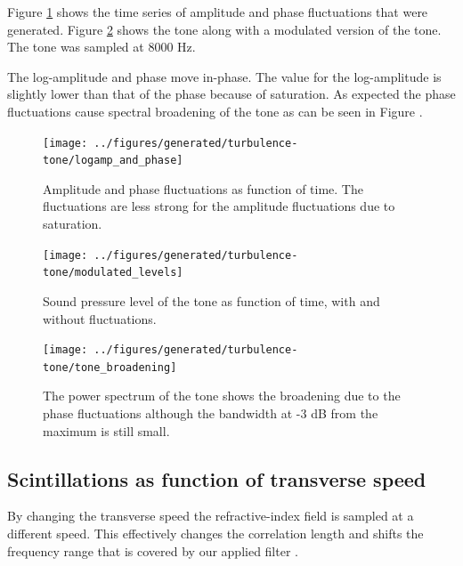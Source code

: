 Figure \ref{fig:results_tone_logamp_and_phase} shows the time series of
amplitude and phase fluctuations that were generated. Figure
\ref{fig:results_tone_levels} shows the tone along with a modulated version of
the tone. The tone was sampled at 8000 Hz.

The log-amplitude and phase move in-phase. The value for the log-amplitude is slightly lower than that of the phase because of saturation.
As expected the phase fluctuations cause spectral broadening of the tone as can be seen in Figure \cite{Ostashev2016}.

\begin{figure}[H]
  \centering
  \texttt{[image: ../figures/generated/turbulence-tone/logamp\_and\_phase]}
  \caption{Amplitude and phase fluctuations as function of time. The fluctuations are less strong for the amplitude fluctuations due to saturation.}
  \label{fig:results_tone_logamp_and_phase}
\end{figure}

\begin{figure}[H]
  \centering
  \texttt{[image: ../figures/generated/turbulence-tone/modulated\_levels]}
  \caption{Sound pressure level of the tone as function of time, with and without fluctuations.}
  \label{fig:results_tone_levels}
\end{figure}



\begin{figure}[H]
  \centering
  \texttt{[image: ../figures/generated/turbulence-tone/tone\_broadening]}
  \caption{The power spectrum of the tone shows the broadening due to the phase fluctuations although the bandwidth at -3 dB from the maximum is still small.}
  \label{fig:results_tone_broadening}
\end{figure}

\subsection{Scintillations as function of transverse speed}
By changing the transverse speed the refractive-index field is sampled at a
different speed. This effectively changes the correlation length and shifts the frequency range that is covered by our applied filter \cite{Wilson1999}.

